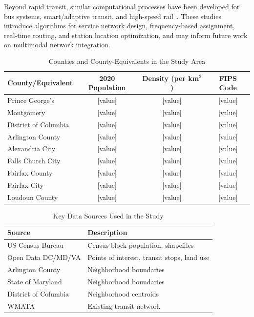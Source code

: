\documentclass[manuscript]{acmart}
\begin{document}
Beyond rapid transit, similar computational processes have been developed for bus systems, smart/adaptive transit, and high-speed rail~\cite{bib:nayan2016bus,bib:owais2022frequency,bib:perivier2021realtime,bib:roy2023hsr}. These studies introduce algorithms for service network design, frequency-based assignment, real-time routing, and station location optimization, and may inform future work on multimodal network integration.



\begin{table}[h]
\caption{Counties and County-Equivalents in the Study Area}
\label{tab:counties}
\begin{tabular}{lccc}
\toprule
County/Equivalent & 2020 Population & Density (per km$^2$) & FIPS Code \\
\midrule
Prince George's & [value] & [value] & [value] \\
Montgomery & [value] & [value] & [value] \\
District of Columbia & [value] & [value] & [value] \\
Arlington County & [value] & [value] & [value] \\
Alexandria City & [value] & [value] & [value] \\
Falls Church City & [value] & [value] & [value] \\
Fairfax County & [value] & [value] & [value] \\
Fairfax City & [value] & [value] & [value] \\
Loudoun County & [value] & [value] & [value] \\
\bottomrule
\end{tabular}
\end{table}


\begin{table}[h]
\caption{Key Data Sources Used in the Study}
\label{tab:datasources}
\begin{tabular}{ll}
\toprule
Source & Description \\
\midrule
US Census Bureau & Census block population, shapefiles \\
Open Data DC/MD/VA & Points of interest, transit stops, land use \\
Arlington County & Neighborhood boundaries \\
State of Maryland & Neighborhood boundaries \\
District of Columbia & Neighborhood centroids \\
WMATA & Existing transit network \\
\bottomrule
\end{tabular}
\end{table}
\end{document}

